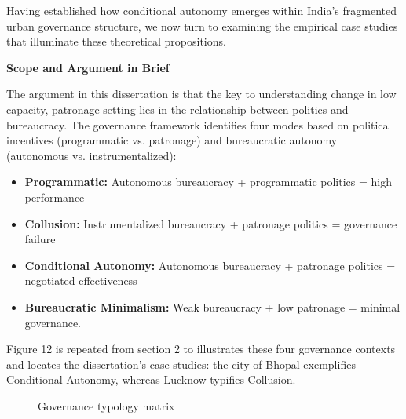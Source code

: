 Having established how conditional autonomy emerges within India's fragmented urban governance structure, we now turn to examining the empirical case studies that illuminate these theoretical propositions.

\textbf{{Scope and Argument in Brief}}

The argument in this dissertation is that the key to understanding change in low capacity, patronage setting lies in the relationship between politics and bureaucracy.
The governance framework identifies four modes based on political incentives (programmatic vs. patronage) and bureaucratic autonomy (autonomous vs. instrumentalized):
\begin{itemize}
  \item \textbf{Programmatic:} Autonomous bureaucracy + programmatic politics = high performance
  \item \textbf{Collusion:} Instrumentalized bureaucracy + patronage politics = governance failure
  \item \textbf{Conditional Autonomy:} Autonomous bureaucracy + patronage politics = negotiated effectiveness
  \item \textbf{Bureaucratic Minimalism:} Weak bureaucracy + low patronage = minimal governance.
\end{itemize}

Figure 12 is repeated from section 2 to illustrates these four governance contexts and locates the dissertation's case studies: the city of Bhopal exemplifies Conditional Autonomy, whereas Lucknow typifies Collusion.

\begin{figure}[htbp]
  \centering
  \caption{Governance typology matrix}
  \label{fig:governance_matrix}
\end{figure}

